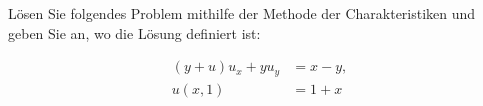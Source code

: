 
\begin{exercise}

Lösen Sie folgendes Problem mithilfe der Methode der Charakteristiken und geben Sie an, wo die Lösung definiert ist:

\begin{align*}
    (y + u) u_x + y u_y
    & =
    x - y, \\
    u(x, 1)
    & =
    1 + x
\end{align*}

\end{exercise}


